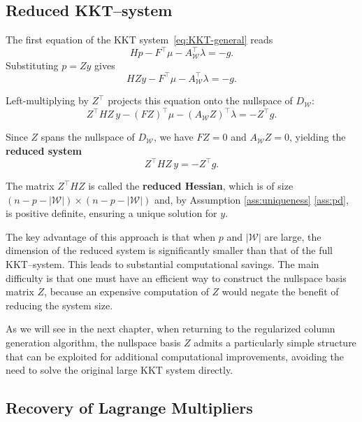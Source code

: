 \documentclass{book}
\theoremstyle{definition}
\newcounter{algorithm_}
\numberwithin{algorithm_}{chapter}
\begin{document}
\subsection{Reduced KKT--system}

The first equation of the KKT system~\eqref{eq:KKT-general} reads
\begin{equation}
H p - F^\top \mu - A_{\mathcal{W}}^\top \lambda = - g.
\end{equation}
Substituting $p = Z y$ gives
\begin{equation}
H Z y - F^\top \mu - A_{\mathcal{W}}^\top \lambda = - g.
\end{equation}

Left-multiplying by $Z^\top$ projects this equation onto the nullspace of $D_{\mathcal{W}}$:
\begin{equation}
Z^\top H Z \, y - (F Z)^\top \mu - (A_{\mathcal{W}} Z)^\top \lambda = - Z^\top g.
\end{equation}

Since $Z$ spans the nullspace of $D_{\mathcal{W}}$, we have $F Z = 0$ and $A_{\mathcal{W}} Z = 0$, yielding the \textbf{reduced system}
\begin{equation}
Z^\top H Z \, y = - Z^\top g.
\end{equation}

The matrix $Z^\top H Z$ is called the \textbf{reduced Hessian}, which is of size $(n - p - |\mathcal{W}|) \times (n - p - |\mathcal{W}|)$ and, by Assumption \ref{ass:uniqueness} \ref{ass:pd}, is positive definite, ensuring a unique solution for $y$.

\bigskip

The key advantage of this approach is that when $p$ and $|\mathcal{W}|$ are large, the dimension of the reduced system is significantly smaller than that of the full KKT--system. This leads to substantial computational savings. The main difficulty is that one must have an efficient way to construct the nullspace basis matrix $Z$, because an expensive computation of $Z$ would negate the benefit of reducing the system size.  

\medskip

As we will see in the next chapter, when returning to the regularized column generation algorithm, the nullspace basis $Z$ admits a particularly simple structure that can be exploited for additional computational improvements, avoiding the need to solve the original large KKT system directly.

\subsection{Recovery of Lagrange Multipliers}
\end{document}

